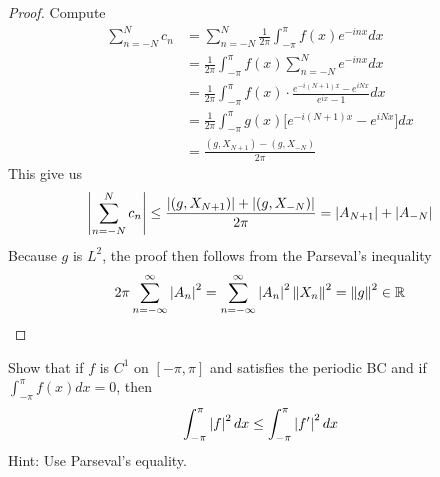 \documentclass{report}
\begin{document}
\begin{proof}
Compute 
\begin{align*}
\sum_{n=-N}^N c_n &= \sum_{n=-N}^N \frac{1}{2\pi }\int_{-\pi }^{\pi } f(x) e^{- i n x}dx \\
&= \frac{1}{2\pi }\int_{-\pi }^{\pi } f(x)\sum_{n=-N}^N  e^{- i n x} dx \\
&=\frac{1}{2\pi } \int_{-\pi }^{\pi }f(x) \cdot \frac{e^{-i (N+1)x}- e^{i Nx}}{e^{ix}-1}dx \\
&=\frac{1}{2\pi }\int_{-\pi }^{\pi } g(x) \Big[e^{-i (N+1)x}- e^{i Nx}  \Big] dx \\
&= \frac{(g,X_{N+1})- (g,X_{-N})}{2\pi }
\end{align*}
This give us 
\begin{align*}
\left|\sum_{n=-N}^N c_n\right| \leq \frac{\left|(g,X_{N+1})\right|+ \left|(g,X_{-N})\right|}{2\pi }=\left|A_{N+1}\right|+ \left|A_{-N}\right|
\end{align*}
Because $g$ is $L^2$, the proof then follows from the Parseval's inequality 
 \begin{align*}
2\pi  \sum_{n=-\infty}^{\infty} \left|A_n\right|^2=\sum_{n=-\infty}^{\infty} \left|A_n\right|^2 \left\| X_n \right\|^2= \left\| g \right\|^2 \in\mathbb{R}
\end{align*}
\end{proof}
\begin{question}{}{}
Show that if $f$ is $C^1$ on  $[- \pi  ,\pi ]$ and satisfies the periodic BC and if $\int_{-\pi }^{\pi }f(x)dx=0$, then 
\begin{align*}
\int_{-\pi }^{\pi } \left|f\right|^2 dx \leq \int_{-\pi }^{\pi } \left|f'\right|^2 dx
\end{align*}
Hint: Use Parseval's equality. 
\end{question}
\end{document}
